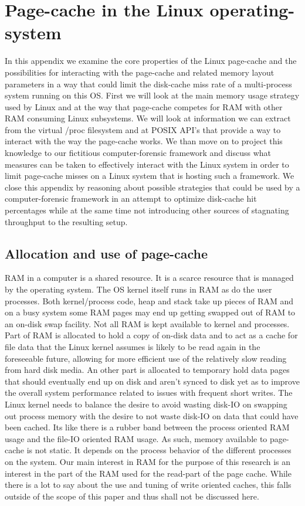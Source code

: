 \chapter{Page-cache in the Linux operating-system}
In this appendix we examine the core properties of the Linux page-cache and the possibilities for interacting with the page-cache and related memory layout parameters in a way that could limit the disk-cache miss rate of a multi-process system running on this OS. First we will look at the main memory usage strategy used by Linux and at the way that page-cache competes for RAM with other RAM consuming Linux subsystems. We will look at information we can extract from the virtual /proc filesystem and at POSIX API's that provide a way to interact with the way the page-cache works. We than move on to project this knowledge to our fictitious computer-forensic framework and discuss what measures can be taken to effectively interact with the Linux system in order to limit page-cache misses on a Linux system that is hosting such a framework. We close this appendix by reasoning about possible strategies that could be used by a computer-forensic framework in an attempt to optimize disk-cache hit percentages while at the same time not introducing other sources of stagnating throughput to the resulting setup.
\section{Allocation and use of page-cache}
RAM in a computer is a shared resource. It is a scarce resource that is managed by the operating system. The OS kernel itself runs in RAM as do the user processes. Both kernel/process code, heap and stack take up pieces of RAM and on a busy system some RAM pages may end up getting swapped out of RAM to an on-disk swap facility. Not all RAM is kept available to kernel and processes. Part of RAM is allocated to hold a copy of on-disk data and to act as a cache for file data that the Linux kernel assumes is likely to be read again in the foreseeable future, allowing for more efficient use of the relatively slow reading from hard disk media. An other part is allocated to temporary hold data pages that should eventually end up on disk and aren't synced to disk yet as to improve the overall system performance related to issues with frequent short writes. The Linux kernel needs to balance the desire to avoid wasting disk-IO on swapping out process memory with the desire to not waste disk-IO on data that could have been cached. Its like there is a rubber band between the process oriented RAM usage and the file-IO oriented RAM usage. As such, memory available to page-cache is not static. It depends on the process behavior of the different processes on the system. Our main interest in RAM for the purpose of this research is an interest in the part of the RAM used for the read-part of the page cache. While there is a lot to say about the use and tuning of write oriented caches, this falls outside of the scope of this paper and thus shall not be discussed here. 
